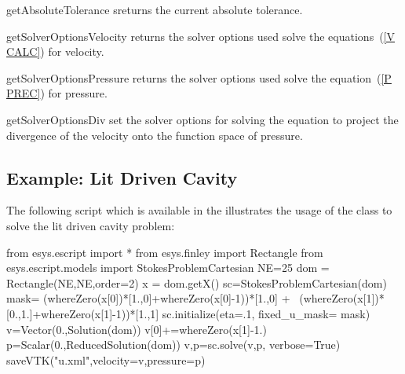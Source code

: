 \begin{methoddesc}[StokesProblemCartesian]{getAbsoluteTolerance}{}
sreturns the current absolute tolerance.
\end{methoddesc}

\begin{methoddesc}[StokesProblemCartesian]{getSolverOptionsVelocity}{}
returns the solver options used  solve the equations~(\ref{V CALC}) for velocity.
\end{methoddesc}

\begin{methoddesc}[StokesProblemCartesian]{getSolverOptionsPressure}{}
returns the solver options used  solve the equation~(\ref{P PREC}) for pressure.
\end{methoddesc}

\begin{methoddesc}[StokesProblemCartesian]{getSolverOptionsDiv}{}
set the solver options for solving the equation to project the divergence of the velocity onto the function space of pressure.
\end{methoddesc}


\subsection{Example: Lit Driven Cavity}
 The following script  
 which is available in the \ExampleDirectory
illustrates the usage of the  class to solve
the lit driven cavity problem:
\begin{python}
from esys.escript import *
from esys.finley import Rectangle
from esys.escript.models import StokesProblemCartesian
NE=25
dom = Rectangle(NE,NE,order=2)
x = dom.getX()
sc=StokesProblemCartesian(dom)
mask= (whereZero(x[0])*[1.,0]+whereZero(x[0]-1))*[1.,0] + \
      (whereZero(x[1])*[0.,1.]+whereZero(x[1]-1))*[1.,1]
sc.initialize(eta=.1, fixed_u_mask= mask)
v=Vector(0.,Solution(dom))
v[0]+=whereZero(x[1]-1.)
p=Scalar(0.,ReducedSolution(dom))
v,p=sc.solve(v,p, verbose=True)
saveVTK("u.xml",velocity=v,pressure=p)
\end{python}

